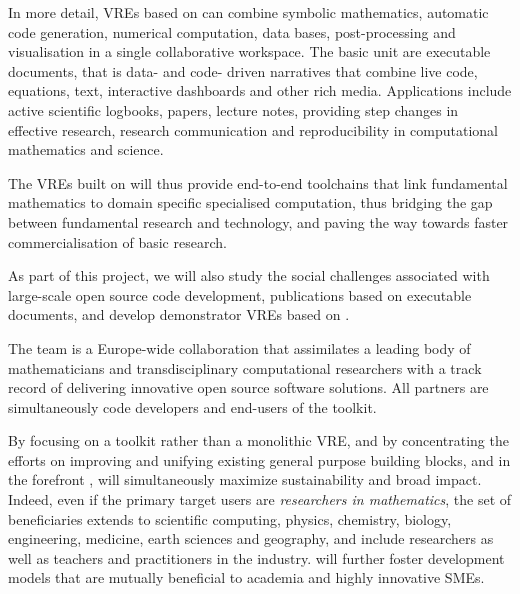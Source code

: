 In more detail, VREs based on \TheProject can combine symbolic
mathematics, automatic code generation, numerical computation, data
bases, post-processing and visualisation in a single collaborative
workspace. The basic unit are executable documents, that is data- and
code- driven narratives that combine live code, equations, text,
interactive dashboards and other rich media. Applications include
active scientific logbooks, papers, lecture notes, providing step
changes in effective research, research communication and
reproducibility in computational mathematics and science.

The VREs built on \TheProject will thus provide end-to-end toolchains that
link fundamental mathematics to domain specific specialised
computation, thus bridging the gap between fundamental research and
technology, and paving the way towards faster commercialisation of
basic research.

As part of this project, we will also study the social challenges
associated with large-scale open source code development, publications based on executable documents, and develop
demonstrator VREs based on \TheProject.

The \TheProject team is a Europe-wide collaboration that assimilates a
leading body of mathematicians and transdisciplinary computational
researchers with a track record of delivering innovative open source
software solutions. All partners are simultaneously code developers and
end-users of the toolkit.

By focusing on a toolkit rather than a monolithic VRE, and by
concentrating the efforts on improving and unifying existing general
purpose building blocks, and in the forefront \Jupyter, \TheProject
will simultaneously maximize sustainability and broad impact. Indeed,
even if the primary target users are \emph{researchers in
  mathematics}, the set of beneficiaries extends to scientific
computing, physics, chemistry, biology, engineering, medicine, earth
sciences and geography, and include researchers as well as teachers
and practitioners in the industry. \TheProject will further foster
development models that are mutually beneficial to academia and highly
innovative SMEs.






\clearpage


